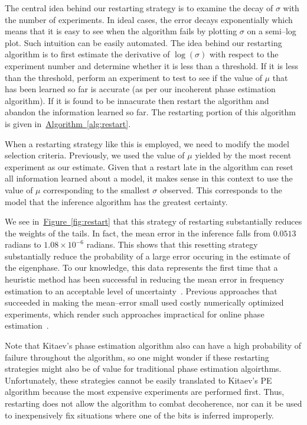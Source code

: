 \documentclass[aps,pra,amsmath,twocolumn,amssymb,superscriptaddress]{revtex4-1}
\newcommand{\fig}[1]{\hyperref[fig:#1]{Figure~\ref*{fig:#1}}}
\newcommand{\alg}[1]{\hyperref[alg:#1]{Algorithm~\ref*{alg:#1}}}
\begin{document}
The central idea behind our restarting strategy is to examine the decay of $\sigma$ with the number of experiments.  In ideal cases, the error decays exponentially which means that it is easy to see when the algorithm fails by plotting $\sigma$ on a semi--log plot.  Such intuition can be easily automated.  The idea behind our restarting algorithm is to first estimate the derivative of $\log(\sigma)$ with respect to the experiment number and determine whether it is less than a threshold.  If it is less than the threshold, perform an experiment to test to see if the value of $\mu$ that has been learned so far is accurate (as per our incoherent phase estimation algorithm).  If it is found to be innacurate then restart the algorithm and abandon the information learned so far.  The restarting portion of this algorithm is given in~\alg{restart}.

When a restarting strategy like this is employed, we need to modify the model selection criteria.  Previously, we used the value of $\mu$ yielded by the most recent experiment as our estimate.   Given that a restart late in the algorithm can reset all information learned about a model, it makes sense in this context to use the value of $\mu$ corresponding to the smallest $\sigma$ observed.  This corresponds to the model that the inference algorithm has the greatest certainty.

We see in~\fig{restart} that this strategy of restarting substantially reduces the weights of the tails.  In fact, the mean error in the inference falls from $0.0513$ radians to $1.08\times 10^{-6}$ radians.  This shows that this resetting strategy substantially reduce the probability of a large error occuring in the estimate of the eigenphase.  To our knowledge, this data represents the first time that a heuristic method has been successful in reducing the mean error in frequency estimation to an acceptable level of uncertainty~\cite{granade_robust_2012}.  Previous approaches that succeeded in making the mean--error small used costly numerically optimized experiments, which render such approaches impractical for online phase estimation~\cite{granade_robust_2012,ferrie_how_2013, wiebe_hamiltonian_2014,wiebe_quantum_2014-1,WGC15}.

Note that Kitaev's phase estimation algorithm also can have a high probability of failure throughout the algorithm, so one might wonder if these restarting strategies might also be of value for traditional phase estimation algoirthms.  Unfortunately, these strategies cannot be easily translated to Kitaev's PE algorithm because the most expensive experiments are performed first.  Thus, restarting does not allow the algorithm to combat decoherence, nor can it be used to inexpensively fix situations where one of the bits is inferred improperly.
\end{document}
